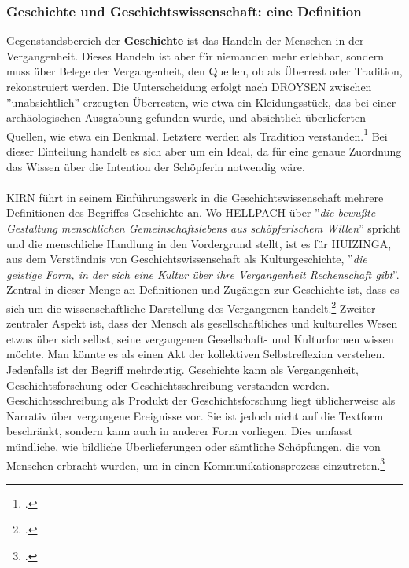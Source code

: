 \documentclass[12pt,a4paper]{article}
\begin{document}
\subsubsection{Geschichte und Geschichtswissenschaft: eine Definition}
Gegenstandsbereich der \textbf{Geschichte} ist das Handeln der Menschen in der Vergangenheit. Dieses Handeln ist aber für niemanden mehr erlebbar, sondern muss über Belege der Vergangenheit, den Quellen, ob als Überrest oder Tradition, rekonstruiert werden. Die Unterscheidung erfolgt nach DROYSEN zwischen ''unabsichtlich'' erzeugten Überresten, wie etwa ein Kleidungsstück, das bei einer archäologischen Ausgrabung gefunden wurde, und absichtlich überlieferten Quellen, wie etwa ein Denkmal. Letztere werden als Tradition verstanden.\footcite[][49–55]{schulz2010neuere} Bei dieser Einteilung handelt es sich aber um ein Ideal, da für eine genaue Zuordnung das Wissen über die Intention der Schöpferin notwendig wäre. 
\\
\\
KIRN führt in seinem Einführungswerk in die Geschichtswissenschaft mehrere Definitionen des Begriffes Geschichte an. Wo HELLPACH über ''\textit{die bewußte Gestaltung menschlichen Gemeinschaftslebens aus schöpferischem Willen}'' spricht und die menschliche Handlung in den Vordergrund stellt, ist es für HUIZINGA, aus dem Verständnis von Geschichtswissenschaft als Kulturgeschichte, ''\textit{die geistige Form, in der sich eine Kultur über ihre Vergangenheit Rechenschaft gibt}''. Zentral in dieser Menge an Definitionen und Zugängen zur Geschichte ist, dass es sich um die wissenschaftliche Darstellung des Vergangenen handelt.\footcite[][S.7-12]{KirnPaul2015EidG} Zweiter zentraler Aspekt ist, dass der Mensch als gesellschaftliches und kulturelles Wesen etwas über sich selbst, seine vergangenen Gesellschaft- und Kulturformen wissen möchte. Man könnte es als einen Akt der kollektiven Selbstreflexion verstehen. Jedenfalls ist der Begriff mehrdeutig. Geschichte kann als Vergangenheit, Geschichtsforschung oder Geschichtsschreibung verstanden werden. Geschichtsschreibung als Produkt der Geschichtsforschung liegt üblicherweise als Narrativ über vergangene Ereignisse vor. Sie ist jedoch nicht auf die Textform beschränkt, sondern kann auch in anderer Form vorliegen. Dies umfasst mündliche, wie bildliche Überlieferungen oder sämtliche Schöpfungen, die von Menschen erbracht wurden, um in einen Kommunikationsprozess einzutreten.\footcite[][S.5-7]{frank2018visualisierungswerkzeuge}
\\
\end{document}
